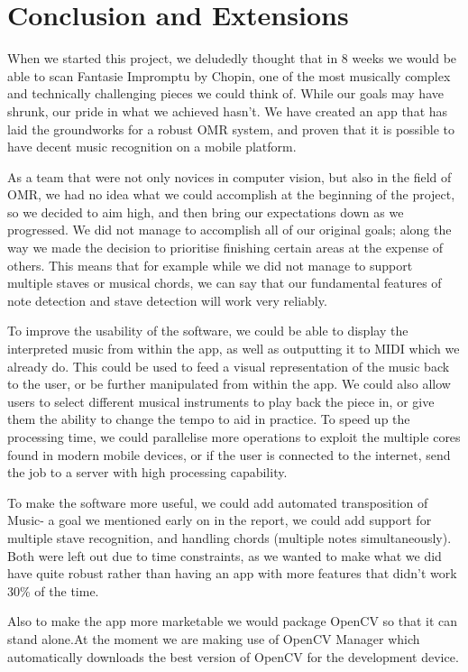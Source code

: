 \section{Conclusion and Extensions}

When we started this project, we deludedly thought that in 8 weeks we would be able to scan Fantasie Impromptu by Chopin, one of the most musically complex and technically challenging pieces we could think of. While our goals may have shrunk, our pride in what we achieved hasn't. We have created an app that has laid the groundworks for a robust OMR system, and proven that it is possible to have decent music recognition on a mobile platform. 

As a team that were not only novices in computer vision, but also in the field of OMR, we had no idea what we could accomplish at the beginning of the project, so we decided to aim high, and then bring our expectations down as we progressed. We did not manage to accomplish all of our original goals; along the way we made the decision to prioritise finishing certain areas at the expense of others. This means that for example while we did not manage to support multiple staves or musical chords, we can say that our fundamental features of note detection and stave detection will work very reliably.
 
To improve the usability of the software, we could be able to display the interpreted music from within the app, as well as outputting it to MIDI which we already do. This could be used to feed a visual representation of the music back to the user, or be further manipulated from within the app. We could also allow users to select different musical instruments to play back the piece in, or give them the ability to change the tempo to aid in practice. To speed up the processing time, we could parallelise more operations to exploit the multiple cores found in modern mobile devices, or if the user is connected to the internet, send the job to a server with high processing capability.
 
To make the software more useful, we could add automated transposition of Music- a goal we mentioned early on in the report, we could add support for multiple stave recognition, and handling chords (multiple notes simultaneously). Both were left out due to time constraints, as we wanted to make what we did have quite robust rather than having an app with more features that didn't work 30\% of the time.

Also to make the app more marketable we would package OpenCV so that it can stand alone\cite{AndroiDev}.At the moment we are making use of OpenCV Manager which automatically downloads the best version of OpenCV for the development device.



